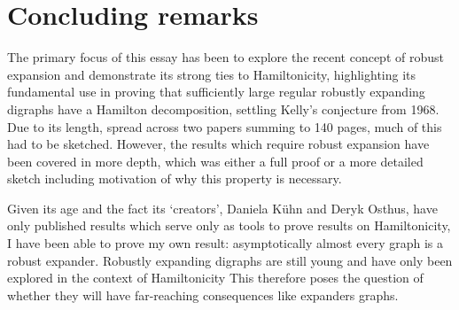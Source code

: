 \documentclass[10pt,letterpaper, reqno]{amsart}
\theoremstyle{definition}
\numberwithin{equation}{section}
\begin{document}
\section{Concluding remarks}
\noindent The primary focus of this essay has been to explore the recent concept of robust expansion and demonstrate its strong ties to Hamiltonicity, highlighting its fundamental use in proving that sufficiently large regular robustly expanding digraphs have a Hamilton decomposition, settling Kelly's conjecture from 1968. Due to its length, spread across two papers summing to 140 pages, much of this had to be sketched. However, the results which require robust expansion have been covered in more depth, which was either a full proof or a more detailed sketch including motivation of why this property is necessary. 

Given its age and the fact its `creators', Daniela K\"{u}hn and Deryk Osthus, have only published results which serve only as tools to prove results on Hamiltonicity, I have been able to prove my own result: asymptotically almost every graph is a robust expander. Robustly expanding digraphs are still young and have only been explored in the context of Hamiltonicity This therefore poses the question of whether they will have far-reaching consequences like expanders graphs. 
	
	
	
\end{document}
